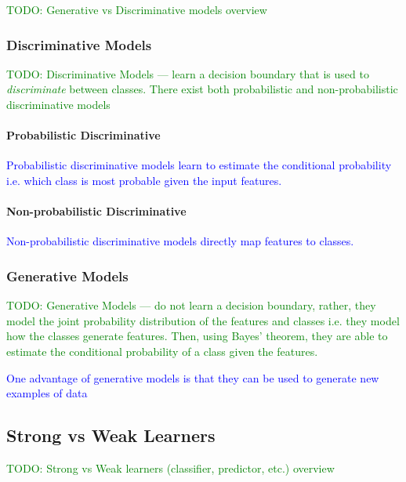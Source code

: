 \textcolor{green}{TODO: Generative vs Discriminative models overview}

\subsubsection{Discriminative Models}

\textcolor{green}{TODO: Discriminative Models --- learn a decision boundary that is used to \textit{discriminate} between classes. There exist both probabilistic and non-probabilistic discriminative models}

\paragraph{Probabilistic Discriminative}

\textcolor{blue}{Probabilistic discriminative models learn to estimate the conditional probability i.e. which class is most probable given the input features.}

\paragraph{Non-probabilistic Discriminative}

\textcolor{blue}{Non-probabilistic discriminative models directly map features to classes.}

\subsubsection{Generative Models}

\textcolor{green}{TODO: Generative Models --- do not learn a decision boundary, rather, they model the joint probability distribution of the features and classes i.e. they model how the classes generate features. Then, using Bayes' theorem, they are able to estimate the conditional probability of a class given the features.}


\textcolor{blue}{One advantage of generative models is that they can be used to generate new examples of data}

\subsection{Strong vs Weak Learners}

\textcolor{green}{TODO: Strong vs Weak learners (classifier, predictor, etc.) overview}

